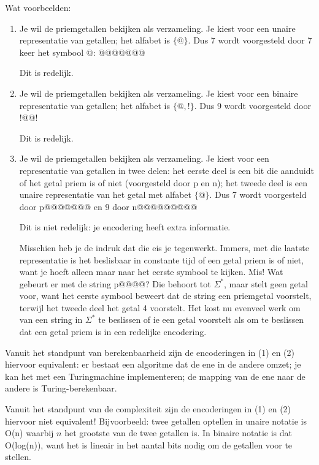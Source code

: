 Wat voorbeelden:
\begin{enumerate}
\item 
Je wil de priemgetallen bekijken als verzameling. Je kiest voor een
unaire representatie van getallen; het alfabet is $\{@\}$. Dus 7 wordt
voorgesteld door 7 keer het symbool @: @@@@@@@

Dit is redelijk.

\item 
Je wil de priemgetallen bekijken als verzameling. Je kiest voor een
binaire representatie van getallen; het alfabet is $\{@,!\}$. Dus 9 wordt
voorgesteld door !@@!

Dit is redelijk.

\item 
Je wil de priemgetallen bekijken als verzameling. Je kiest voor een
representatie van getallen in twee delen: het eerste deel is een bit
die aanduidt of het getal priem is of niet (voorgesteld door p en n);
het tweede deel is een unaire representatie van het getal met alfabet
$\{@\}$. Dus 7 wordt voorgesteld door p@@@@@@@ en 9 door n@@@@@@@@@

Dit is niet redelijk: je encodering heeft extra informatie.

Misschien heb je de indruk dat die eis je tegenwerkt. Immers, met die
laatste representatie is het beslisbaar in constante tijd of een getal
priem is of niet, want je hoeft alleen maar naar het eerste symbool te
kijken. Mis! Wat gebeurt er met de string p@@@@? Die behoort tot
$\Sigma^*$, maar stelt geen getal voor, want het eerste symbool
beweert dat de string een priemgetal voorstelt, terwijl het tweede
deel het getal 4 voorstelt. Het kost nu evenveel werk om van een
string in $\Sigma^*$ te beslissen of ie een getal voorstelt als om te
beslissen dat een getal priem is in een redelijke encodering.


\end{enumerate}

Vanuit het standpunt van berekenbaarheid zijn de encoderingen in (1)
en (2) hiervoor equivalent: er bestaat een algoritme dat de ene in de
andere omzet; je kan het met een Turingmachine implementeren; de
mapping van de ene naar de andere is Turing-berekenbaar.


Vanuit het standpunt van de complexiteit zijn de encoderingen in (1)
en (2) hiervoor niet equivalent! Bijvoorbeeld: twee getallen optellen
in unaire notatie is O(n) waarbij $n$ het grootste van de twee
getallen is. In binaire notatie is dat O(log(n)), want het is lineair
in het aantal bits nodig om de getallen voor te stellen.



